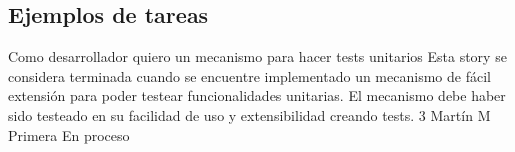 \newcommand{\task}[7]{
  \hspace{7pt}
	\fbox{
	\begin{minipage}{0.88\textwidth}
    {\small \sffamily


            {\normalsize \textbf{#1:} \textit{#2}}

            \vspace{3pt}

            \textbf{Descripción:} #3

            \vspace{5pt}

            \begin{tabular}{ l c l }
            \textbf{Horas estimadas:} #4 & \hspace{0.2\textwidth} & \textbf{Responsable:} #5 \\[1pt]
            \textbf{Horas faltantes:} #6 & \hspace{0.2\textwidth} & \textbf{Estado:} #7 \\
            \end{tabular}

    }
	\end{minipage}
	}
  \vskip
}





\newpage

\subsection{Ejemplos de tareas}

			{Como desarrollador quiero un mecanismo para hacer tests unitarios} %
			{Esta story se considera terminada cuando se encuentre implementado un mecanismo de fácil extensión para poder testear funcionalidades unitarias. } %
			{El mecanismo debe haber sido testeado en su facilidad de uso y extensibilidad creando tests.} %
			{3} %
			{Martín M} %
			{Primera} %
			{En proceso} %

